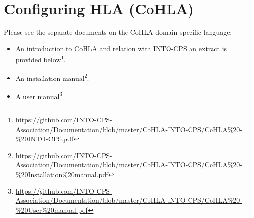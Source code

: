 \chapter{Configuring HLA (CoHLA)}
\label{sec:cohla}

Please see the separate documents on the CoHLA domain specific language:
\begin{itemize}
  \item An introduction to CoHLA and relation with INTO-CPS \dash an extract is provided below\footnote{\url{https://github.com/INTO-CPS-Association/Documentation/blob/master/CoHLA-INTO-CPS/CoHLA\%20-\%20INTO-CPS.pdf}}.
  \item An installation manual\footnote{\url{https://github.com/INTO-CPS-Association/Documentation/blob/master/CoHLA-INTO-CPS/CoHLA\%20-\%20Installation\%20manual.pdf}}.
  \item A user manual\footnote{\url{https://github.com/INTO-CPS-Association/Documentation/blob/master/CoHLA-INTO-CPS/CoHLA\%20-\%20User\%20manual.pdf}}.
\end{itemize}
